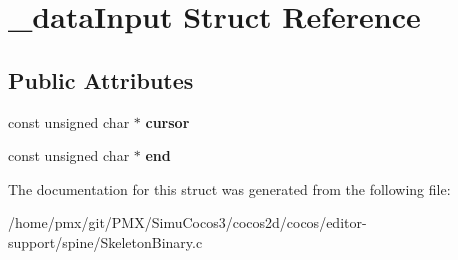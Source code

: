 \hypertarget{struct__dataInput}{}\section{\+\_\+data\+Input Struct Reference}
\label{struct__dataInput}
\subsection*{Public Attributes}
\begin{DoxyCompactItemize}
\item 
\mbox{\label{struct__dataInput_aab6ad655bd4d4654fe8b6fa19912369b}} 
const unsigned char $\ast$ {\bfseries cursor}
\item 
\mbox{\label{struct__dataInput_af26e023f0d3b079d3ece3b54ef1dc5b7}} 
const unsigned char $\ast$ {\bfseries end}
\end{DoxyCompactItemize}


The documentation for this struct was generated from the following file\+:\begin{DoxyCompactItemize}
\item 
/home/pmx/git/\+P\+M\+X/\+Simu\+Cocos3/cocos2d/cocos/editor-\/support/spine/Skeleton\+Binary.\+c\end{DoxyCompactItemize}
